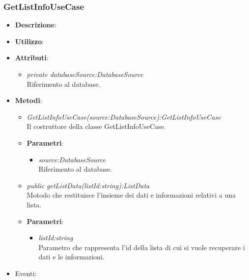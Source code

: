 \subsubsection{GetListInfoUseCase}
\begin{itemize}
\item \textbf{Descrizione}: 
\item \textbf{Utilizzo}:
\item \textbf{Attributi}: 
	\begin{itemize}
	\item \textit{private databaseSource:DatabaseSource}\\
		Riferimento al database.
	\end{itemize}
\item \textbf{Metodi}:
	\begin{itemize}
	\item \textit{GetListInfoUseCase(source:DatabaseSource):GetListInfoUseCase}\\
	Il costruttore della classe GetListInfoUseCase.
			\item{\textbf{Parametri}: \begin{itemize}
			\item \textit{source:DatabaseSource}\\
		Riferimento al database.
			\end{itemize}}
	\item \textit{public getListData(listId:string):ListData}\\
	Motodo che restituisce l'insieme dei dati e informazioni relativi a una lista.
				\item{\textbf{Parametri}: \begin{itemize}
				\item \textit{listId:string}\\
				Parametro che rappresenta l'id della lista di cui si vuole recuperare i dati e le informazioni.
				\end{itemize}}
	\end{itemize}
\item{Eventi}:
\end{itemize}


